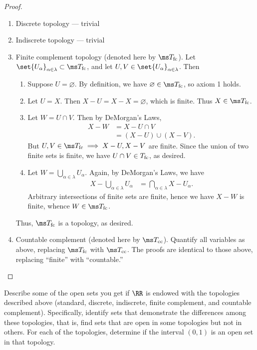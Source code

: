 \begin{proof}~
  \begin{enumerate}
    \item Discrete topology --- trivial
    \item Indiscrete topology --- trivial
    \item Finite complement topology (denoted here by $\ms T_{\rm fc}$). Let
      $\set{U_\alpha}_{\alpha \in \lambda} \subset \ms T_{\rm fc}$, and let $U,V
      \in \set{U_\alpha}_{\alpha \in \lambda}$. Then
      \begin{enumerate}[label=\arabic*.]
        \item Suppose $U = \varnothing$. By definition, we have $\varnothing \in
          \ms T_{\rm fc}$, so axiom 1 holds.
        \item Let $U = X$. Then $X - U = X - X = \varnothing$, which is finite.
          Thus $X \in \ms T_{\rm fc}$.
        \item Let $W = U \cap V$. Then by DeMorgan's Laws,
          \begin{align*}
            X - W
            &= X - U\cap V \\
            &= (X - U) \cup (X - V).
          \end{align*}
          But $U,V \in \ms T_{\rm fc} \implies X - U, X-V$ are finite. Since the
          union of two finite sets is finite, we have $U \cap V \in T_{\rm fc}$,
          as desired.
        \item Let $W = \bigcup_{\alpha\in\lambda} U_\alpha$. Again, by
          DeMorgan's Laws, we have
          \begin{align*}
            X - \bigcup_{\alpha \in \lambda} U_\alpha
            &= \bigcap_{\alpha \in \lambda} X - U_\alpha.
          \end{align*}
          Arbitrary intersections of finite sets are finite, hence we have $X -
          W$ is finite, whence $W \in \ms T_{\rm fc}$.
      \end{enumerate}
      Thus, $\ms T_{\rm fc}$ is a topology, as desired.
    \item Countable complement (denoted here by $\ms T_{\rm cc}$). Quantify all
      variables as above, replacing $\ms T_{\rm fc}$ with $\ms T_{\rm cc}$. The
      proofs are identical to those above, replacing ``finite'' with
      ``countable.''
  \end{enumerate}
\end{proof}
\begin{problem}[3.6]
  Describe some of the open sets you get if $\RR$ is endowed with the topologies
  described above (standard, discrete, indiscrete, finite complement, and
  countable complement). Specifically, identify sets that demonstrate the
  differences among these topologies, that is, find sets that are open in some
  topologies but not in others. For each of the topologies, determine if the
  interval $(0,1)$ is an open set in that topology.
\end{problem}
